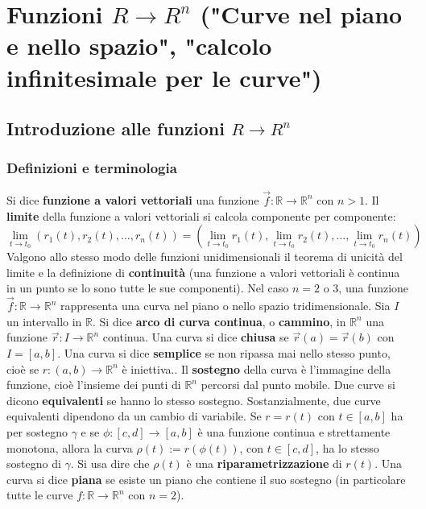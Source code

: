 \section{Funzioni $R \rightarrow R^n$ ("Curve nel piano e nello spazio", "calcolo infinitesimale per le curve")}
\subsection{Introduzione alle funzioni $R \rightarrow R^n$}
\subsubsection{Definizioni e terminologia}
Si dice \textbf{funzione a valori vettoriali} una funzione $\vec{f} : \mathbb{R} \rightarrow  \mathbb{R}^n$ con $n > 1$.\newline
\newline
Il \textbf{limite} della funzione a valori vettoriali si calcola componente per componente:
\[
    \lim_{t\rightarrow t_0}(r_1(t), r_2(t), \dots, r_n(t)) = \left(\lim_{t\rightarrow t_0}r_1(t), \lim_{t\rightarrow t_0}r_2(t), \dots, \lim_{t\rightarrow t_0}r_n(t)\right)
\]
Valgono allo stesso modo delle funzioni unidimensionali il teorema di unicità del limite e la definizione di \textbf{continuità} (una funzione a valori vettoriali è continua in un punto se lo sono tutte le sue componenti).\newline
\newline
Nel caso $n = 2$ o $3$, una funzione $\vec{f} : \mathbb{R} \rightarrow  \mathbb{R}^n$ rappresenta una curva nel piano o nello spazio tridimensionale.\newline
\newline
Sia $I$ un intervallo in $\mathbb{R}$. Si dice \textbf{arco di curva continua}, o \textbf{cammino}, in $\mathbb{R}^n$ una funzione $\vec{r}: I \rightarrow \mathbb{R}^n$ continua.\newline
\newline
Una curva si dice \textbf{chiusa} se $\vec{r}(a) = \vec{r}(b)$ con $I=[a,b]$.\newline
\newline
Una curva si dice \textbf{semplice} se non ripassa mai nello stesso punto, cioè se $r:(a,b) \rightarrow \mathbb{R}^n$ è iniettiva..\newline
\newline
Il \textbf{sostegno} della curva è l'immagine della funzione, cioè l'insieme dei punti di $\mathbb{R}^n$ percorsi dal punto mobile.\newline
\newline
Due curve si dicono \textbf{equivalenti} se hanno lo stesso sostegno. Sostanzialmente, due curve equivalenti dipendono da un cambio di variabile. Se $r = r(t)$ con $t \in[a,b]$ ha per sostegno $\gamma$ e se $\phi: [c,d] \rightarrow [a,b]$ è una funzione continua e strettamente monotona, allora la curva $\rho(t) := r(\phi(t))$, con $t \in [c,d]$, ha lo stesso sostegno di $\gamma$. Si usa dire che $\rho(t)$ è una \textbf{riparametrizzazione} di $r(t)$.
\newline
Una curva si dice \textbf{piana} se esiste un piano che contiene il suo sostegno (in particolare tutte le curve  $f: \mathbb{R} \rightarrow \mathbb{R}^n$ con $n=2$).
